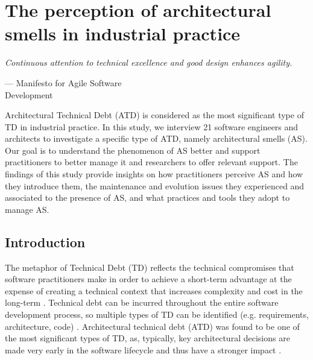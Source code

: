 \setlength{\headheight}{1.2cm}
\renewcommand{\publ}{\flushleft\footnotesize{Based on:\\[0.1cm]
		\textit{D. Sas, I. Pigazzini, P. Avgeriou and F. Arcelli F., "The Perception of Architectural Smells in Industrial Practice," in IEEE Software, vol. 38, no. 6, pp. 35-41, Nov.-Dec. 2021, doi: 10.1109/MS.2021.3103664.} \\[0.1cm]
}}

\chapter{The perception of architectural smells in industrial practice}
\label{chap:2}
\epigraph{\emph{Continuous attention to technical excellence
and good design enhances agility.}}{--- Manifesto for  Agile Software\\Development}


\begin{Abstract}
	Architectural Technical Debt (ATD) is considered as the most significant type of TD in industrial practice. In this study, we interview 21 software engineers and architects to investigate a specific type of ATD, namely architectural smells (AS). Our goal is to understand the phenomenon of AS better and support practitioners to better manage it and researchers to offer relevant support. The findings of this study provide insights on how practitioners perceive AS and how they introduce them, the maintenance and evolution issues they experienced and associated to the presence of AS, and what practices and tools they adopt to manage AS.
\end{Abstract}

\section{Introduction}\label{sec:2.1}
The metaphor of Technical Debt (TD) reflects the technical compromises that software practitioners make in order to achieve a short-term advantage at the expense of creating a technical context that increases complexity and cost in the long-term \cite{Avgeriou2016}.  
Technical debt can be incurred throughout the entire software development process, so multiple types of TD can be identified (e.g. requirements, architecture, code) \cite{Alves2016}. Architectural technical debt (ATD) was found to be one of the most significant types of TD, as, typically, key architectural decisions are made very early in the software lifecycle and thus have a stronger impact \cite{Ernst2015}.

